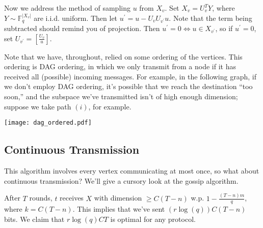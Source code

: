 \documentclass[11pt]{article}
\newcommand{\F}{\mathbb{F}}
\begin{document}
Now we address the method of sampling $u$ from $X_v$. Set $X_v = U_v^TY$, where $Y \sim \F_q^{|X_v|}$ are i.i.d. uniform. Then let $u^\prime = u - U_vU_{v^\prime}u$. Note that the term being subtracted should remind you of projection. Then $u^\prime = 0 \iff u \in X_{v^\prime}$, so if $u^\prime = 0$, set $U_{v^\prime} = \left[\frac{U_v}{u}\right]$.

Note that we have, throughout, relied on some ordering of the vertices. This ordering is DAG ordering, in which we only transmit from a node if it has received all (possible) incoming messages. For example, in the following graph, if we don't employ DAG ordering, it's possible that we reach the destination ``too soon,'' and the subspace we've transmitted isn't of high enough dimension; suppose we take path $(i)$, for example.

\begin{center}
\texttt{[image: dag\_ordered.pdf]}
\end{center}

\subsection{Continuous Transmission}

This algorithm involves every vertex communicating at most once, so what about continuous transmission?  We'll give a cursory look at the gossip algorithm.

After $T$ rounds, $t$ receives $X$ with dimension $\geq C(T-n)$ w.p. $1 - \frac{(T - n)m}{q}$, where $k = C(T-n)$. This implies that we've sent $(r\log(q))C(T-n)$ bits. We claim that $r\log(q) CT$ is optimal for any protocol.
\end{document}
